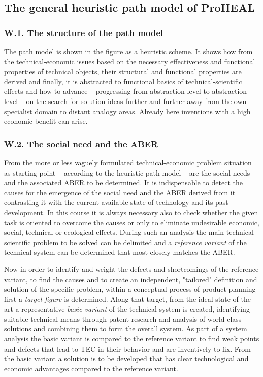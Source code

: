 \documentclass[11pt,a4paper]{article}
\begin{document}
\subsection{The general heuristic path model of ProHEAL}

\subsubsection*{W.1. The structure of the path model}

The path model is shown in the figure as a heuristic scheme. It shows how from
the technical-economic issues based on the necessary effectiveness and
functional properties of technical objects, their structural and functional
properties are derived and finally, it is abstracted to functional basics of
technical-scientific effects and how to advance -- progressing from
abstraction level to abstraction level -- on the search for solution ideas
further and further away from the own specialist domain to distant analogy
areas.  Already here inventions with a high economic benefit can arise.

\subsubsection*{W.2. The social need and the ABER}

From the more or less vaguely formulated technical-economic problem situation
as starting point -- according to the heuristic path model -- are the social
needs and the associated ABER to be determined. It is indispensable to detect
the causes for the emergence of the social need and the ABER derived from it
contrasting it with the current available state of technology and its past
development.  In this course it is always necessary also to check whether the
given task is oriented to overcome the causes or only to eliminate undesirable
economic, social, technical or ecological effects.  During such an analysis
the main technical-scientific problem to be solved can be delimited and a
\emph{reference variant} of the technical system can be determined that most
closely matches the ABER.

Now in order to identify and weight the defects and shortcomings of the
reference variant, to find the causes and to create an independent, "tailored"
definition and solution of the specific problem, within a conceptual process
of product planning first a \emph{target figure} is determined. Along that
target, from the ideal state of the art a representative \emph{basic variant}
of the technical system is created, identifying suitable technical means
through patent research and analysis of world-class solutions and combining
them to form the overall system. As part of a system analysis the basic
variant is compared to the reference variant to find weak points and defects
that lead to TEC in their behavior and are inventively to fix. From the basic
variant a solution is to be developed that has clear technological and
economic advantages compared to the reference variant.
\end{document}
